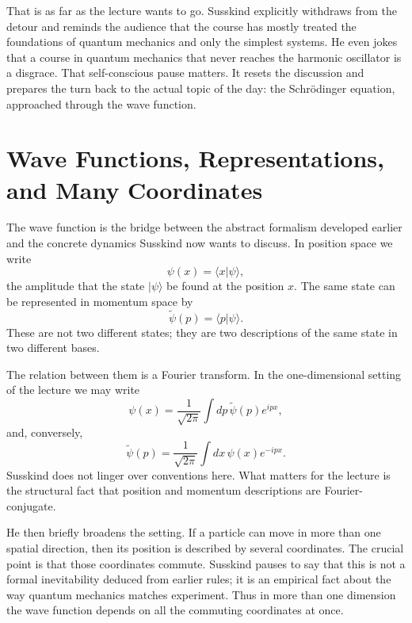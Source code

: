 That is as far as the lecture wants to go. Susskind explicitly withdraws from the detour and reminds the audience that the course has mostly treated the foundations of quantum mechanics and only the simplest systems. He even jokes that a course in quantum mechanics that never reaches the harmonic oscillator is a disgrace. That self-conscious pause matters. It resets the discussion and prepares the turn back to the actual topic of the day: the Schr\"odinger equation, approached through the wave function.

\section{Wave Functions, Representations, and Many Coordinates}

The wave function is the bridge between the abstract formalism developed earlier and the concrete dynamics Susskind now wants to discuss. In position space we write
\begin{equation}
\psi(x)=\langle x|\psi\rangle,
\end{equation}
the amplitude that the state \(|\psi\rangle\) be found at the position \(x\). The same state can be represented in momentum space by
\begin{equation}
\tilde{\psi}(p)=\langle p|\psi\rangle.
\end{equation}
These are not two different states; they are two descriptions of the same state in two different bases.

The relation between them is a Fourier transform. In the one-dimensional setting of the lecture we may write
\begin{equation}
\psi(x)=\frac{1}{\sqrt{2\pi}}\int dp\,\tilde{\psi}(p)e^{ipx},
\end{equation}
and, conversely,
\begin{equation}
\tilde{\psi}(p)=\frac{1}{\sqrt{2\pi}}\int dx\,\psi(x)e^{-ipx}.
\end{equation}
Susskind does not linger over conventions here. What matters for the lecture is the structural fact that position and momentum descriptions are Fourier-conjugate.

He then briefly broadens the setting. If a particle can move in more than one spatial direction, then its position is described by several coordinates. The crucial point is that those coordinates commute. Susskind pauses to say that this is not a formal inevitability deduced from earlier rules; it is an empirical fact about the way quantum mechanics matches experiment. Thus in more than one dimension the wave function depends on all the commuting coordinates at once.


